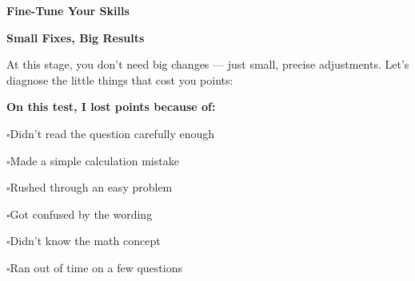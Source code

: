 \clearpage
\thispagestyle{empty}
{\sffamily

\begin{center}
{\fontsize{22}{26}\selectfont\bfseries\color{funGreen} \faTools\hspace{3mm}Fine-Tune Your Skills\hspace{3mm}\faTools}

\vspace{2mm}
{\color{funGray}\hrulefill}
\end{center}

\vspace{3mm}

\begin{tcolorbox}[
    enhanced,
    colback=funGreenLight,
    colframe=funGreen!50,
    arc=10pt,
    boxrule=1.5pt,
    left=6mm, right=6mm, top=5mm, bottom=5mm,
]
{\large\bfseries\color{funGreenDark} \faWrench\hspace{2mm}Small Fixes, Big Results}

\vspace{2mm}

At this stage, you don't need big changes — just small, precise adjustments. Let's diagnose the little things that cost you points:

\vspace{3mm}

\textbf{On this test, I lost points because of:}

\vspace{2mm}

\hspace{3mm}$\square$\hspace{2mm}Didn't read the question carefully enough

\hspace{3mm}$\square$\hspace{2mm}Made a simple calculation mistake

\hspace{3mm}$\square$\hspace{2mm}Rushed through an easy problem

\hspace{3mm}$\square$\hspace{2mm}Got confused by the wording

\hspace{3mm}$\square$\hspace{2mm}Didn't know the math concept

\hspace{3mm}$\square$\hspace{2mm}Ran out of time on a few questions


\end{tcolorbox}}
